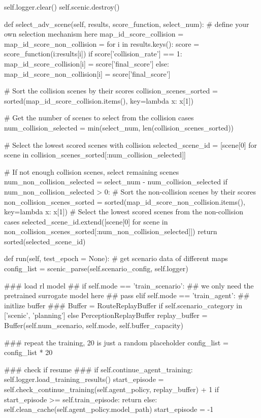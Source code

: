 \begin{appendix}
self.logger.clear()
self.scenic.destroy()

def select\_adv\_scene(self, results, score\_function, select\_num):
\# define your own selection mechanism here
map\_id\_score\_collision = {}
map\_id\_score\_non\_collision = {}
for i in results.keys():
score = score\_function({i:results[i]})
if score['collision\_rate'] == 1:
map\_id\_score\_collision[i] = score['final\_score']
else:
map\_id\_score\_non\_collision[i] = score['final\_score']

\# Sort the collision scenes by their scores
collision\_scenes\_sorted = sorted(map\_id\_score\_collision.items(), key=lambda x: x[1])

\# Get the number of scenes to select from the collision cases
num\_collision\_selected = min(select\_num, len(collision\_scenes\_sorted))

\# Select the lowest scored scenes with collision
selected\_scene\_id = [scene[0] for scene in collision\_scenes\_sorted[:num\_collision\_selected]]

\# If not enough collision scenes, select remaining scenes
num\_non\_collision\_selected = select\_num - num\_collision\_selected
if num\_non\_collision\_selected > 0:
\# Sort the non-collision scenes by their scores
non\_collision\_scenes\_sorted = sorted(map\_id\_score\_non\_collision.items(), key=lambda x: x[1])
\# Select the lowest scored scenes from the non-collision cases
selected\_scene\_id.extend([scene[0] for scene in non\_collision\_scenes\_sorted[:num\_non\_collision\_selected]])
return sorted(selected\_scene\_id)

def run(self, test\_epoch = None):
\# get scenario data of different maps
config\_list = scenic\_parse(self.scenario\_config, self.logger)


\#\#\# load rl model \#\#
if self.mode == 'train\_scenario':
\#\# we only need the pretrained surrogate model here \#\#
pass
elif self.mode == 'train\_agent':
\#\# initlize buffer \#\#\#
Buffer = RouteReplayBuffer if self.scenario\_category in ['scenic', 'planning'] else PerceptionReplayBuffer
replay\_buffer = Buffer(self.num\_scenario, self.mode, self.buffer\_capacity)

\#\#\# repeat the training, 20 is just a random placeholder
config\_list = config\_list * 20

\#\#\# check if resume \#\#\#
if self.continue\_agent\_training:
self.logger.load\_training\_results()
start\_episode = self.check\_continue\_training(self.agent\_policy, replay\_buffer) + 1
if start\_episode >= self.train\_episode:
return
else:
self.clean\_cache(self.agent\_policy.model\_path)
start\_episode = -1


\end{appendix}
